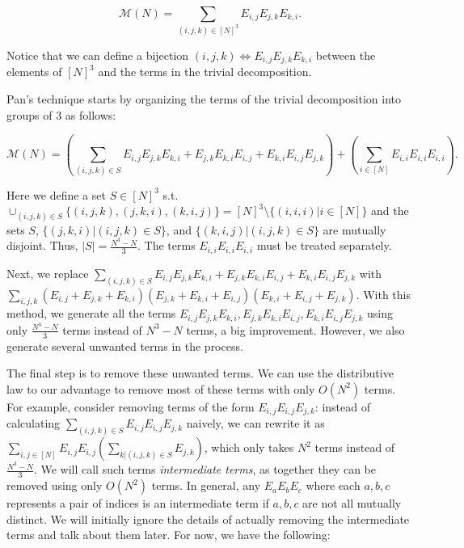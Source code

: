 \documentclass{article}
\begin{document}
\[\mathcal{M}(N)=\sum_{(i,j,k)\in [N]^3}E_{i,j}E_{j,k}E_{k,i}.\]

Notice that we can define a bijection $(i,j,k)\Longleftrightarrow E_{i,j}E_{j,k}E_{k,i}$ between the elements of $[N]^3$ and the terms in the trivial decomposition.

Pan's technique starts by organizing the terms of the trivial decomposition into groups of 3 as follows:

\[\mathcal{M}(N)=(\sum_{(i,j,k)\in S}E_{i,j}E_{j,k}E_{k,i}+E_{j,k}E_{k,i}E_{i,j}+E_{k,i}E_{i,j}E_{j,k})+(\sum_{i\in [N]} E_{i,i}E_{i,i}E_{i,i}).\]

Here we define a set $S\in [N]^3$ s.t. $\cup_{(i,j,k)\in S}\{(i,j,k),(j,k,i),(k,i,j)\}=[N]^3\setminus\{(i,i,i)|i\in [N]\}$ and the sets $S$, $\{(j,k,i)|(i,j,k)\in S\}$, and $\{(k,i,j)|(i,j,k)\in S\}$ are mutually disjoint. Thus, $|S|=\frac{N^3-N}{3}$. The terms $E_{i,i}E_{i,i}E_{i,i}$ must be treated separately.

Next, we replace $\sum_{(i,j,k)\in S}E_{i,j}E_{j,k}E_{k,i}+E_{j,k}E_{k,i}E_{i,j}+E_{k,i}E_{i,j}E_{j,k}$ with $\sum_{i,j,k}(E_{i,j}+E_{j,k}+E_{k,i})(E_{j,k}+E_{k,i}+E_{i,j})(E_{k,i}+E_{i,j}+E_{j,k})$. With this method, we generate all the terms $E_{i,j}E_{j,k}E_{k,i}, E_{j,k}E_{k,i}E_{i,j}, E_{k,i}E_{i,j}E_{j,k}$ using only $\frac{N^3-N}{3}$ terms instead of $N^3-N$ terms, a big improvement. However, we also generate several unwanted terms in the process.

The final step is to remove these unwanted terms. We can use the distributive law to our advantage to remove most of these terms with only $O(N^2)$ terms. For example, consider removing terms of the form $E_{i,j}E_{i,j}E_{j,k}$: instead of calculating $\sum_{(i,j,k)\in S} E_{i,j}E_{i,j}E_{j,k}$ naively, we can rewrite it as $\sum_{i,j\in [N]}E_{i,j}E_{i,j}(\sum_{k|(i,j,k)\in S}E_{j,k})$, which only takes $N^2$ terms instead of $\frac{N^3-N}{3}$. We will call such terms \textit{intermediate terms}, as together they can be removed using only $O(N^2)$ terms. In general, any $E_aE_bE_c$ where each $a,b,c$ represents a pair of indices is an intermediate term if $a,b,c$ are not all mutually distinct. We will initially ignore the details of actually removing the intermediate terms and talk about them later. For now, we have the following:

\begin{comment}
We will define the sets $S_{IJ},S_{JK},S_{KI}$ to be $\{(i,j)|(i,j,k)\in S\},\{(j,k)|(i,j,k)\in S\},\{(k,i)|(i,j,k)\in S\}$.
\end{comment}
\end{document}
